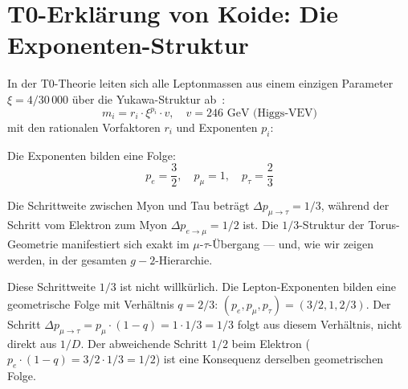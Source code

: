 \section{T0-Erklärung von Koide: Die Exponenten-Struktur}

In der T0-Theorie leiten sich alle Leptonmassen aus einem einzigen Parameter $\xi = 4/30\,000$ über die Yukawa-Struktur ab~\cite{Pascher006}:
\begin{equation}
	m_i = r_i \cdot \xi^{p_i} \cdot v, \quad v = 246 \text{ GeV (Higgs-VEV)}
	\label{eq:yukawa}
\end{equation}
mit den rationalen Vorfaktoren $r_i$ und Exponenten $p_i$:

\begin{table}[h]
	\centering
	\caption{T0-Leptonmassen aus einem einzigen Parameter $\xi$}
	\label{tab:masses}
\end{table}

Die Exponenten bilden eine Folge:
\begin{equation}
	p_e = \frac{3}{2}, \quad p_\mu = 1, \quad p_\tau = \frac{2}{3}
	\label{eq:exponents}
\end{equation}

Die Schrittweite zwischen Myon und Tau beträgt $\Delta p_{\mu\to\tau} = 1/3$, während der Schritt vom Elektron zum Myon $\Delta p_{e\to\mu} = 1/2$ ist. Die $1/3$-Struktur der Torus-Geometrie manifestiert sich exakt im $\mu$-$\tau$-Übergang — und, wie wir zeigen werden, in der gesamten $g-2$-Hierarchie.

Diese Schrittweite $1/3$ ist nicht willkürlich. Die Lepton-Exponenten
bilden eine geometrische Folge mit Verhältnis $q = 2/3$:
$(p_e, p_\mu, p_\tau) = (3/2, 1, 2/3)$. Der Schritt
$\Delta p_{\mu\to\tau} = p_\mu \cdot (1-q) = 1 \cdot 1/3 = 1/3$ folgt
aus diesem Verhältnis, nicht direkt aus $1/D$.
Der abweichende Schritt $1/2$ beim Elektron
($p_e \cdot (1-q) = 3/2 \cdot 1/3 = 1/2$) ist eine Konsequenz
derselben geometrischen Folge.

